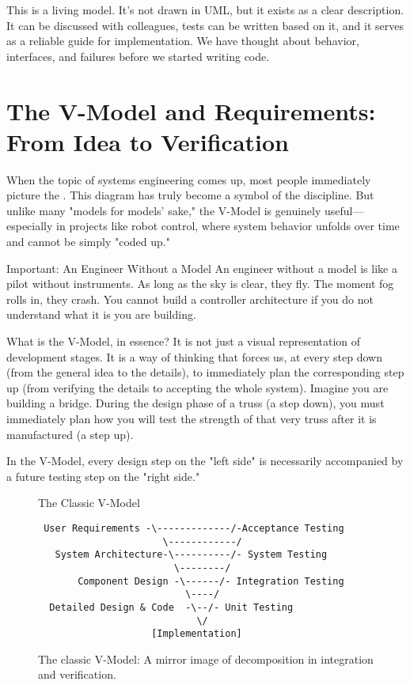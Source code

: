 This is a living model. It's not drawn in UML, but it exists as a clear description. It can be discussed with colleagues, tests can be written based on it, and it serves as a reliable guide for implementation. We have thought about behavior, interfaces, and failures before we started writing code.

\section{The V-Model and Requirements: From Idea to Verification}

When the topic of systems engineering comes up, most people immediately picture the . This diagram has truly become a symbol of the discipline. But unlike many "models for models' sake," the V-Model is genuinely useful—especially in projects like robot control, where system behavior unfolds over time and cannot be simply "coded up."

\begin{principlebox}{Important: An Engineer Without a Model}
An engineer without a model is like a pilot without instruments. As long as the sky is clear, they fly. The moment fog rolls in, they crash. You cannot build a controller architecture if you do not understand what it is you are building.
\end{principlebox}

What is the V-Model, in essence? It is not just a visual representation of development stages. It is a way of thinking that forces us, at every step down (from the general idea to the details), to immediately plan the corresponding step up (from verifying the details to accepting the whole system). Imagine you are building a bridge. During the design phase of a truss (a step down), you must immediately plan how you will test the strength of that very truss after it is manufactured (a step up).

In the V-Model, every design step on the "left side" is necessarily accompanied by a future testing step on the "right side."

\begin{figure}[h!]
    \centering
    \begin{infobox}{The Classic V-Model}
        \begin{verbatim}
 User Requirements -\-------------/-Acceptance Testing
                      \------------/ 
   System Architecture-\----------/- System Testing
                        \--------/ 
       Component Design -\------/- Integration Testing
                          \----/
  Detailed Design & Code  -\--/- Unit Testing
                            \/
                    [Implementation] 
        \end{verbatim}
    \end{infobox}
    \caption{The classic V-Model: A mirror image of decomposition in integration and verification.}
    \label{fig:v_model}
\end{figure}





